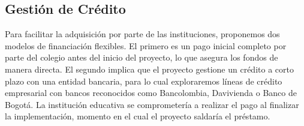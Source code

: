 \subsection{Gestión de Crédito}

Para facilitar la adquisición por parte de las instituciones, proponemos dos
modelos de financiación flexibles. El primero es un pago inicial completo por
parte del colegio antes del inicio del proyecto, lo que asegura los fondos de
manera directa. El segundo implica que el proyecto gestione un crédito a corto
plazo con una entidad bancaria, para lo cual exploraremos líneas de crédito
empresarial con bancos reconocidos como Bancolombia, Davivienda o Banco de
Bogotá. La institución educativa se comprometería a realizar el pago al
finalizar la implementación, momento en el cual el proyecto saldaría el
préstamo.
